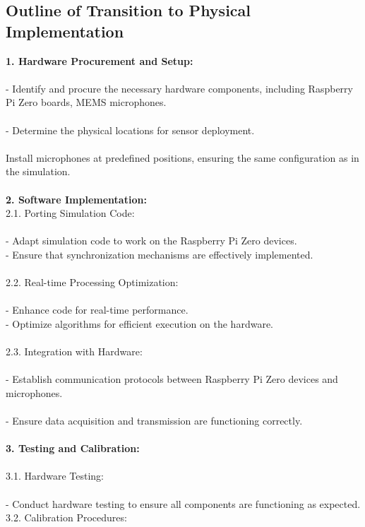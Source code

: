 \documentclass[a4paper,11pt]{article}
\begin{document}
\subsection{Outline of Transition to Physical Implementation}
\textbf{1. Hardware Procurement and Setup:} 
\\\\
- Identify and procure the necessary hardware components, including Raspberry Pi Zero boards, MEMS microphones. \\\\
- Determine the physical locations for sensor deployment. \\\\
Install microphones at predefined positions, ensuring the same configuration as in the simulation. 
\\\\
\textbf{2. Software Implementation:}\\
2.1. Porting Simulation Code:\\\\
- Adapt simulation code to work on the Raspberry Pi Zero devices. \\
- Ensure that synchronization mechanisms are effectively implemented.\\\\
2.2. Real-time Processing Optimization: \\\\
- Enhance code for real-time performance. \\
- Optimize algorithms for efficient execution on the hardware. \\\\
2.3. Integration with Hardware: \\\\
- Establish communication protocols between Raspberry Pi Zero devices and microphones. \\\\
- Ensure data acquisition and transmission are functioning correctly. \\\\
\textbf{3. Testing and Calibration:} \\\\
3.1. Hardware Testing: \\\\
- Conduct hardware testing to ensure all components are functioning as expected. \\
3.2. Calibration Procedures: \\\\
\end{document}
